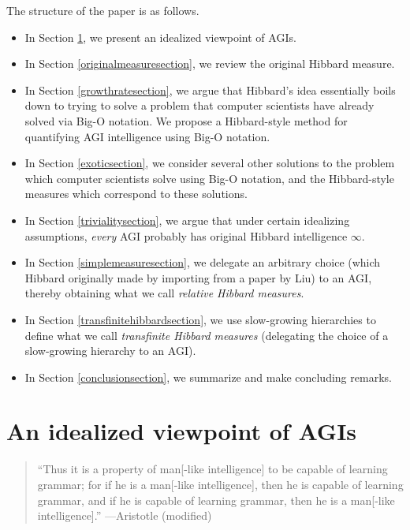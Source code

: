 \documentclass{article}
\begin{document}
The structure of the paper is as follows.
\begin{itemize}
    \item
    In Section \ref{agiperspectivesection}, we present an idealized viewpoint of AGIs.
    \item
    In Section \ref{originalmeasuresection}, we review the original Hibbard measure.
    \item
    In Section \ref{growthratesection}, we argue that Hibbard's idea essentially
    boils down to trying to
    solve a problem that computer scientists have already solved via Big-O notation.
    We propose a Hibbard-style method for quantifying AGI intelligence using Big-O
    notation.
    \item
    In Section \ref{exoticsection}, we consider several other solutions to
    the problem which computer
    scientists solve using Big-O notation, and the Hibbard-style measures which
    correspond to these solutions.
    \item
    In Section \ref{trivialitysection}, we argue that
    under certain idealizing assumptions, \emph{every} AGI probably has
    original Hibbard intelligence $\infty$.
    \item
    In Section \ref{simplemeasuresection}, we delegate an arbitrary choice
    (which Hibbard originally made by importing from a paper by Liu) to an AGI,
    thereby obtaining what we call \emph{relative Hibbard measures}.
    \item
    In Section \ref{transfinitehibbardsection}, we use
    slow-growing hierarchies to define what we call \emph{transfinite Hibbard measures}
    (delegating the choice of a slow-growing hierarchy to an AGI).
    \item
    In Section \ref{conclusionsection}, we summarize and make concluding remarks.
\end{itemize}

\section{An idealized viewpoint of AGIs}
\label{agiperspectivesection}

\begin{quote}
    ``Thus it is a property of man[-like intelligence] to be capable of learning
    grammar; for if he is a man[-like intelligence], then he is capable of learning
    grammar, and if he is capable of learning grammar, then he is
    a man[-like intelligence].'' ---Aristotle \cite{aristotle} (modified)
\end{quote}
\end{document}
